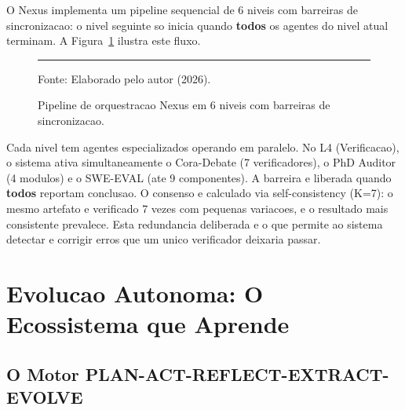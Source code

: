 \documentclass[12pt,a4paper,oneside,sumario=tradicional,chapter=TITLE,section=TITLE,subsection=TITLE,english,brazil]{abntex2}
\begin{document}
O Nexus implementa um pipeline sequencial de 6 niveis com barreiras de sincronizacao: o nivel seguinte so inicia quando \textbf{todos} os agentes do nivel atual terminam. A Figura~\ref{fig:nexus} ilustra este fluxo.

\begin{figure}[H]\centering
{}
\caption{Pipeline de orquestracao Nexus em 6 niveis com barreiras de sincronizacao.}\label{fig:nexus}
\small\vspace{2pt}\hrule\vspace{2pt}Fonte: Elaborado pelo autor (2026).\smallskip
\end{figure}

Cada nivel tem agentes especializados operando em paralelo. No L4 (Verificacao), o sistema ativa simultaneamente o Cora-Debate (7 verificadores), o PhD Auditor (4 modulos) e o SWE-EVAL (ate 9 componentes). A barreira e liberada quando \textbf{todos} reportam conclusao. O consenso e calculado via self-consistency (K=7): o mesmo artefato e verificado 7 vezes com pequenas variacoes, e o resultado mais consistente prevalece. Esta redundancia deliberada e o que permite ao sistema detectar e corrigir erros que um unico verificador deixaria passar.

\section{Evolucao Autonoma: O Ecossistema que Aprende}

\subsection{O Motor PLAN-ACT-REFLECT-EXTRACT-EVOLVE}
\end{document}
